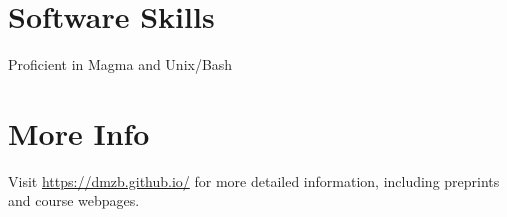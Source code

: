 \documentclass[margin,line]{res}
\newenvironment{list1}{
  \begin{list}{\ding{113}}{%
      \setlength{\itemsep}{0in}
      \setlength{\parsep}{0in} \setlength{\parskip}{0in}
      \setlength{\topsep}{0in} \setlength{\partopsep}{0in}
      \setlength{\leftmargin}{0.17in}}}{\end{list}}
\begin{document}
\begin{resume}
\section{\sc Software Skills}
Proficient in Magma and Unix/Bash

\section{\sc More Info}
Visit \url{https://dmzb.github.io/} for more detailed information, including preprints and course webpages.








\end{resume}
\end{document}
